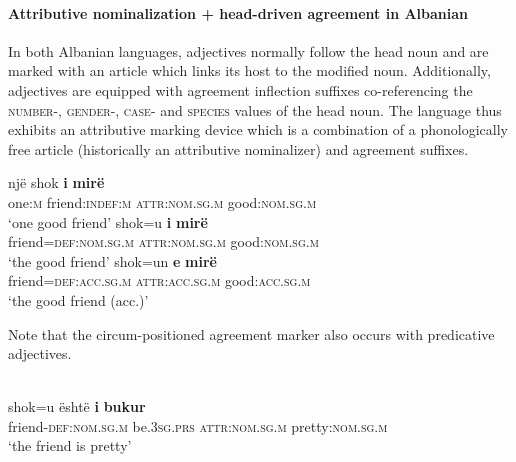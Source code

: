\paragraph*{Attributive nominalization + head\hyp{}driven agreement in Albanian}
In both Albanian languages, adjectives normally follow the head noun and are marked with an article which links its host to the modified noun. Additionally, adjectives are equipped with agreement inflection suffixes co-referencing the \textsc{number}-, \textsc{gender}-, \textsc{case}- and \textsc{species} values of the head noun. The language thus exhibits an attributive marking device which is a combination of a phonologically free article (historically an attributive nominalizer) and agreement suffixes.
\begin{exe}
\label{albanian ex}
\begin{xlist}
\ex
\gll	një	shok 	\textbf{i}	\textbf{mirë}\\
	one:\textsc{m}	friend:\textsc{indef:m} 	\textsc{attr:nom.sg.m}	good:\textsc{nom.sg.m}\\
\glt	‘one good friend’
\ex	
\gll	shok=u			\textbf{i}			\textbf{mirë}\\
	friend=\textsc{def:nom.sg.m} 	\textsc{attr:nom.sg.m} 	good:\textsc{nom.sg.m}\\
\glt	‘the good friend’
\ex
\gll	shok=un					\textbf{e}			\textbf{mirë}\\
	friend=\textsc{def:acc.sg.m} 	\textsc{attr:acc.sg.m} 	good:\textsc{acc.sg.m}\\
\glt	‘the good friend (acc.)’
\end{xlist}
\end{exe}
Note that the circum-positioned agreement marker also occurs with predicative adjectives. 
\begin{exe}
\\
\gll	shok=u është \textbf{i} \textbf{bukur}\\
	friend-\textsc{def:nom.sg.m} be\textsc{.3sg.prs} \textsc{attr:nom.sg.m} pretty:\textsc{nom.sg.m}\\
\glt	‘the friend is pretty’
\end{exe}
